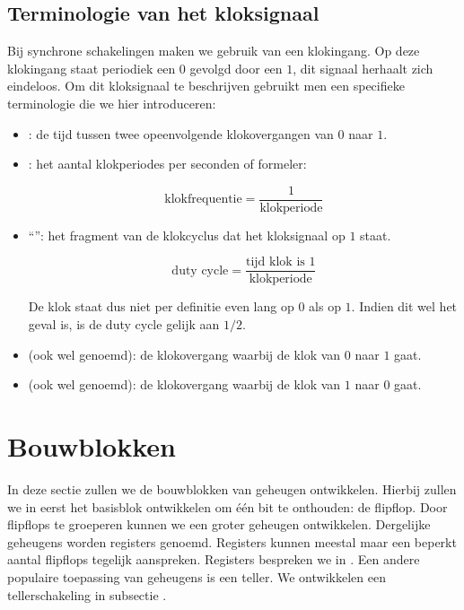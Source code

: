 \subsection{Terminologie van het kloksignaal}
Bij synchrone schakelingen maken we gebruik van een klokingang. Op deze klokingang staat periodiek een $0$ gevolgd door een $1$, dit signaal herhaalt zich eindeloos. Om dit kloksignaal te beschrijven gebruikt men een specifieke terminologie die we hier introduceren:
\begin{itemize}
 \item {}: de tijd tussen twee opeenvolgende klokovergangen van $0$ naar $1$.
 \item {}: het aantal klokperiodes per seconden of formeler:

\begin{equation}
\mbox{klokfrequentie}=\displaystyle\frac{1}{\mbox{klokperiode}}
\end{equation}

 \item ``'': het fragment van de klokcyclus dat het kloksignaal op $1$ staat.

\begin{equation}
\mbox{duty cycle}=\displaystyle\frac{\mbox{tijd klok is $1$}}{\mbox{klokperiode}}
\end{equation}

De klok staat dus niet per definitie even lang op $0$ als op $1$. Indien dit wel het geval is, is de duty cycle gelijk aan $1/2$.
 \item {} (ook wel  genoemd): de klokovergang waarbij de klok van $0$ naar $1$ gaat.
 \item {} (ook wel  genoemd): de klokovergang waarbij de klok van $1$ naar $0$ gaat.
\end{itemize}

\section{Bouwblokken}
In deze sectie zullen we de bouwblokken van geheugen ontwikkelen. Hierbij zullen we in  eerst het basisblok ontwikkelen om \'e\'en bit te onthouden: de flipflop. Door flipflops te groeperen kunnen we een groter geheugen ontwikkelen. Dergelijke geheugens worden registers genoemd. Registers kunnen meestal maar een beperkt aantal flipflops tegelijk aanspreken. Registers bespreken we in . Een andere populaire toepassing van geheugens is een teller. We ontwikkelen een tellerschakeling in subsectie .

